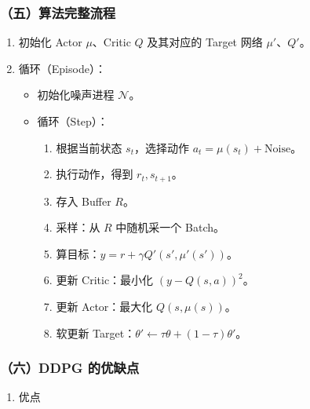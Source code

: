 \hypertarget{ux4e94ux7b97ux6cd5ux5b8cux6574ux6d41ux7a0b}{%
\subsubsection{（五）算法完整流程}\label{ux4e94ux7b97ux6cd5ux5b8cux6574ux6d41ux7a0b}}

\begin{enumerate}
\def\labelenumi{\arabic{enumi}.}
\tightlist
\item
  初始化 Actor \(\mu\)、Critic \(Q\) 及其对应的 Target 网络 \(\mu'\)、\(Q'\)。
\item
  循环（Episode）：

  \begin{itemize}
  \tightlist
  \item
    初始化噪声进程 \(\mathcal{N}\)。
  \item
    循环（Step）：

    \begin{enumerate}
    \def\labelenumii{\arabic{enumii}.}
    \tightlist
    \item
      根据当前状态 \(s_t\)，选择动作 \(a_t=\mu(s_t)+\mathrm{Noise}\)。
    \item
      执行动作，得到 \(r_t,s_{t+1}\)。
    \item
      存入 Buffer \(R\)。
    \item
      采样：从 \(R\) 中随机采一个 Batch。
    \item
      算目标：\(y=r+\gamma Q'(s',\mu'(s'))\)。
    \item
      更新 Critic：最小化 \((y-Q(s,a))^{2}\)。
    \item
      更新 Actor：最大化 \(Q(s,\mu(s))\)。
    \item
      软更新 Target：\(\theta'\leftarrow\tau\theta+(1-\tau)\theta'\)。
    \end{enumerate}
  \end{itemize}
\end{enumerate}

\hypertarget{ux516dddpg-ux7684ux4f18ux7f3aux70b9}{%
\subsubsection{（六）DDPG 的优缺点}\label{ux516dddpg-ux7684ux4f18ux7f3aux70b9}}

\begin{enumerate}
\def\labelenumi{\arabic{enumi}.}
\tightlist
\item
  优点
\end{enumerate}


